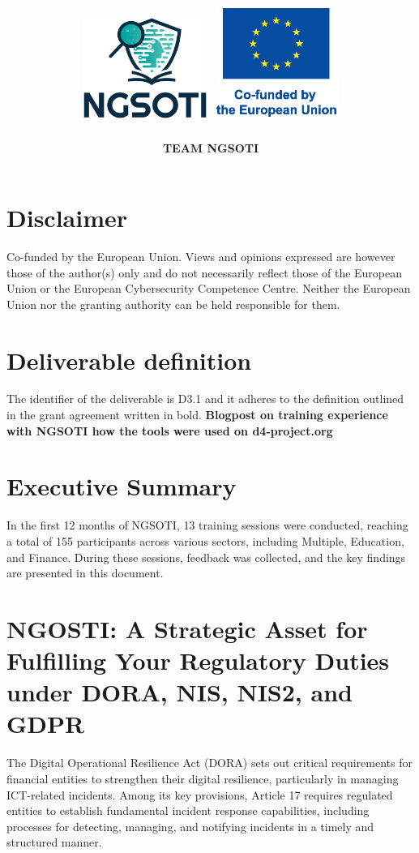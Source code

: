\documentclass[10pt,a4paper]{report}
\title{
    \Huge \textbf{\delivtitle} \\[0.5cm]
    \includegraphics[width=0.3\textwidth]{img/ngsoti.eps}
    \hspace{1cm}
    \includegraphics[width=0.3\textwidth]{img/eu_funded_en.eps}
}
\author{\textbf{TEAM NGSOTI}}
\date{\delivdate}
\begin{document}
\maketitle
\thispagestyle{empty} %

\newpage
\tableofcontents
\newpage
\section*{Disclaimer}
Co-funded by the European Union. Views and opinions expressed are however
those of the author(s) only and do not necessarily reflect those of the
European Union or the European Cybersecurity Competence Centre. Neither
the European Union nor the granting authority can be held responsible for them.

\section*{Deliverable definition}
The identifier of the deliverable is D3.1 and it adheres to the definition
outlined in the grant agreement written in bold.
\textbf{Blogpost on training experience with NGSOTI how the tools were used on d4-project.org}

\section*{Executive Summary}
In the first 12 months of NGSOTI, 13 training sessions were conducted, reaching
a total of 155 participants across various sectors, including Multiple,
Education, and Finance. During these sessions, feedback was collected, and
the key findings are presented in this document.


\section*{NGOSTI: A Strategic Asset for Fulfilling Your Regulatory Duties under DORA, NIS, NIS2, and GDPR}

The Digital Operational Resilience Act (DORA) sets out critical requirements
for financial entities to strengthen their digital resilience, particularly in
managing ICT-related incidents. Among its key provisions, Article 17 requires
regulated entities to establish fundamental incident response capabilities,
including processes for detecting, managing, and notifying incidents in a
timely and structured manner.
\end{document}
